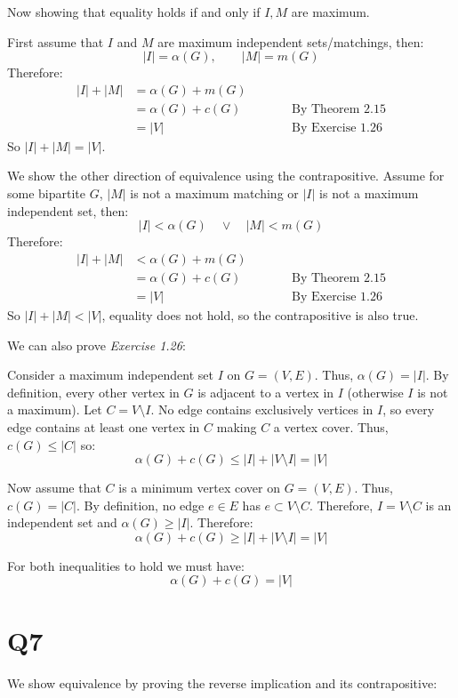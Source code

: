 \documentclass[a4paper, 11pt]{article}
\begin{document}
\begin{multicols*}{2}
	Now showing that equality holds if and only if $I,M$ are maximum.
	\begin{mdframed}
		First assume that $I$ and $M$ are maximum independent sets/matchings, then:
		$$|I|=\alpha(G),\qquad |M|=m(G)$$
		Therefore:
		\begin{alignat*}{2}
			|I|+|M| & = \alpha(G) + m(G) &        &                         \\
			        & =  \alpha(G)+c(G)  & \qquad & \text{By Theorem 2.15}  \\
			        & = |V|              & \qquad & \text{By Exercise 1.26}
		\end{alignat*}
		So $|I|+|M| = |V|$.

		We show the other direction of equivalence using the contrapositive. Assume for some bipartite $G$, $|M|$ is not a maximum matching or $|I|$ is not a maximum independent set, then:
		$$|I|<\alpha(G)\quad\lor\quad|M|<m(G)$$
		Therefore:
		\begin{alignat*}{2}
			|I|+|M| & < \alpha(G) + m(G) &        &                         \\
			        & =  \alpha(G)+c(G)  & \qquad & \text{By Theorem 2.15}  \\
			        & = |V|              & \qquad & \text{By Exercise 1.26}
		\end{alignat*}
		So $|I|+|M| < |V|$, equality does not hold, so the contrapositive is also true.
	\end{mdframed}


	We can also prove \textit{Exercise 1.26}:
	\begin{mdframed}
		Consider a maximum independent set $I$ on $G=(V,E)$. Thus, $\alpha(G)=|I|$. By definition, every other vertex in $G$ is adjacent to a vertex in $I$ (otherwise $I$ is not a maximum). Let $C=V\setminus I$. No edge contains exclusively vertices in $I$, so every edge contains at least one vertex in $C$ making $C$ a vertex cover. Thus, $c(G)\leq |C|$ so:
		$$\alpha(G)+c(G)\leq|I|+|V\setminus I| = |V|$$

		Now assume that $C$ is a minimum vertex cover on $G=(V,E)$. Thus, $c(G)=|C|$. By definition, no edge $e\in E$ has $e\subset V\setminus C$. Therefore, $I=V\setminus C$ is an independent set and $\alpha(G)\geq |I|$. Therefore:
		$$\alpha(G)+c(G)\geq|I|+|V\setminus I| = |V|$$

		For both inequalities to hold we must have:
		$$\alpha(G)+c(G)=|V|$$
	\end{mdframed}

	\section*{Q7}
	We show equivalence by proving the reverse implication and its contrapositive:


\end{multicols*}
\end{document}
